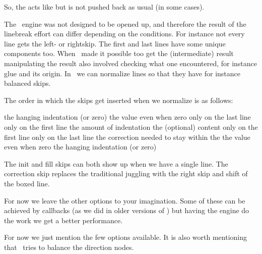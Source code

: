 So, the  acts like  but is not pushed back as
usual (in some cases).

\stopnewprimitive

\startnewprimitive[title={\prm {normalizelinemode}}]

The \TEX\ engine was not designed to be opened up, and therefore the result of
the linebreak effort can differ depending on the conditions. For instance not
every line gets the left- or rightskip. The first and last lines have some unique
components too. When \LUATEX\ made it possible too get the (intermediate) result
manipulating the result also involved checking what one encountered, for instance
glue and its origin. In \LUAMETATEX\ we can normalize lines so that they have for
instance balanced skips.

\starttworows
{}
\stoptworows

The order in which the skips get inserted when we normalize is as follows:

\starttabulate
\NC {}     \NC the hanging indentation (or zero) \NC \NR
\NC {}         \NC the value even when zero \NC \NR
\NC {}  \NC only on the last line \NC \NR
\NC {}  \NC only on the first line \NC \NR
\NC {}       \NC the amount of indentation \NC \NR
\NC \unknown                \NC the (optional) content \NC \NR
\NC {} \NC only on the first line \NC \NR
\NC {} \NC only on the last line \NC \NR
\NC {}   \NC the correction needed to stay within the  \NC \NR
\NC {}        \NC the value even when zero \NC \NR
\NC {}    \NC the hanging indentation (or zero) \NC \NR
\stoptabulate

The init and fill skips can both show up when we have a single line. The
correction skip replaces the traditional juggling with the right skip and shift
of the boxed line.

For now we leave the other options to your imagination. Some of these can be
achieved by callbacks (as we did in older versions of \CONTEXT) but having the
engine do the work we get a better performance.

\stopnewprimitive

\startnewprimitive[title={\prm {normalizeparmode}}]

For now we just mention the few options available. It is also worth mentioning that
\LUAMETATEX\ tries to balance the direction nodes.

